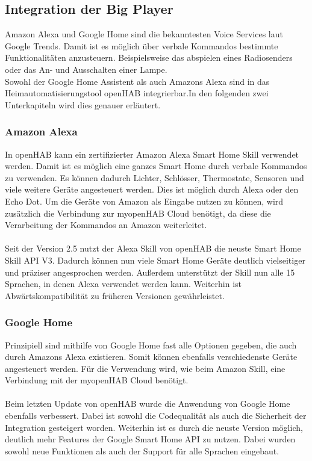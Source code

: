 \subsection{Integration der Big Player}
Amazon Alexa und Google Home sind die bekanntesten Voice Services laut Google Trends. \cite{GOOGLET01:AG} Damit ist es möglich über verbale Kommandos bestimmte Funktionalitäten anzusteuern. Beispielsweise das abspielen eines Radiosenders oder das An- und Ausschalten einer Lampe.\\
Sowohl der Google Home Assistent als auch Amazons Alexa sind in das Heimautomatisierungstool openHAB integrierbar.In den folgenden zwei Unterkapiteln wird dies genauer erläutert.\cite{OPENHAB02:OH}

\subsubsection{Amazon Alexa}
In openHAB kann ein zertifizierter Amazon Alexa Smart Home Skill verwendet werden. Damit ist es möglich eine ganzes Smart Home durch verbale Kommandos zu verwenden. Es können dadurch Lichter, Schlösser, Thermostate, Sensoren und viele weitere Geräte angesteuert werden. Dies ist möglich durch Alexa oder den Echo Dot.\cite{ALEXA01:AL}\cite{ALEXA02:AL}
Um die Geräte von Amazon als Eingabe nutzen zu können, wird zusätzlich die Verbindung zur myopenHAB Cloud benötigt, da diese die Verarbeitung der Kommandos an Amazon weiterleitet.\\
\\
Seit der Version 2.5 nutzt der Alexa Skill von openHAB die neuste Smart Home Skill API V3. Dadurch können nun viele Smart Home Geräte deutlich vielseitiger und präziser angesprochen werden. Außerdem unterstützt der Skill nun alle 15 Sprachen, in denen Alexa verwendet werden kann. Weiterhin ist Abwärtskompatibilität zu früheren Versionen gewährleistet.\cite{OPENHAB02:OH}

\subsubsection{Google Home}

Prinzipiell sind mithilfe von Google Home fast alle Optionen gegeben, die auch durch Amazons Alexa existieren. Somit können ebenfalls verschiedenste Geräte angesteuert werden. Für die Verwendung wird, wie beim Amazon Skill, eine Verbindung mit der myopenHAB Cloud benötigt.\\
\\
Beim letzten Update von openHAB wurde die Anwendung von Google Home ebenfalls verbessert. Dabei ist sowohl die Codequalität als auch die Sicherheit der Integration gesteigert worden. Weiterhin ist es durch die neuste Version möglich, deutlich mehr Features der Google Smart Home API zu nutzen. Dabei wurden sowohl neue Funktionen als auch der Support für alle Sprachen eingebaut.\cite{OPENHAB02:OH}\cite{GOOGLEH01:GH}

